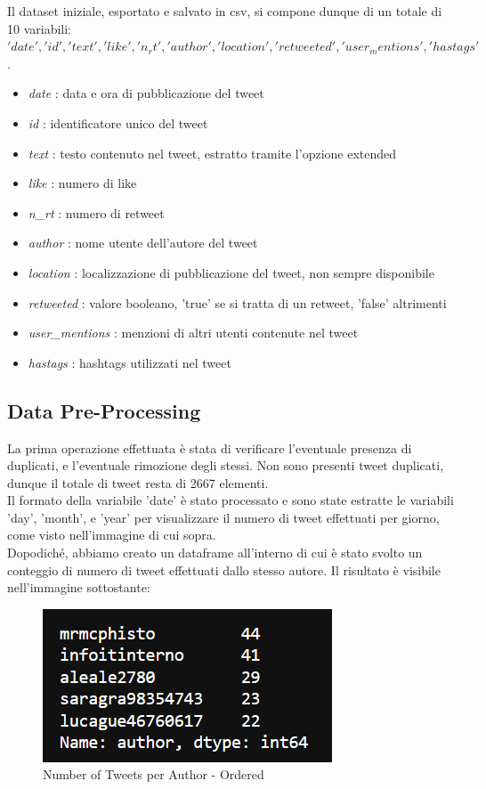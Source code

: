 \documentclass[12pt,journal,compsoc]{IEEEtran}
\begin{document}
Il dataset iniziale, esportato e salvato in csv, si compone dunque di un totale di 10 variabili: $'date', 'id', 'text', 'like', 'n_rt', 'author', 'location', 'retweeted', 'user_mentions', 'hastags'$.

\begin{itemize}
	\item \textit{date} : data e ora di pubblicazione del tweet
	\item \textit{id} : identificatore unico del tweet
	\item \textit{text} : testo contenuto nel tweet, estratto tramite l'opzione extended
	\item \textit{like} : numero di like
	\item \textit{n\_rt} : numero di retweet
	\item \textit{author} : nome utente dell'autore del tweet
	\item \textit{location} : localizzazione di pubblicazione del tweet, non sempre disponibile
	\item \textit{retweeted} : valore booleano, 'true' se si tratta di un retweet, 'false' altrimenti
	\item \textit{user\_mentions} : menzioni di altri utenti contenute nel tweet
	\item \textit{hastags} : hashtags utilizzati nel tweet
\end{itemize}

\subsection{Data Pre-Processing}
La prima operazione effettuata è stata di verificare l'eventuale presenza di duplicati, e l'eventuale rimozione degli stessi. Non sono presenti tweet duplicati, dunque il totale di tweet resta di 2667 elementi.\\
Il formato della variabile 'date' è stato processato e sono state estratte le variabili 'day', 'month', e 'year' per visualizzare il numero di tweet effettuati per giorno, come visto nell'immagine di cui sopra.\\
Dopodiché, abbiamo creato un dataframe all'interno di cui è stato svolto un conteggio di numero di tweet effettuati dallo stesso autore. Il risultato è visibile nell'immagine sottostante:

\begin{figure}[H]
  \includegraphics[scale=1]{./images/freq-authors.png}
  \caption{Number of Tweets per Author - Ordered}
\end{figure}
\end{document}
